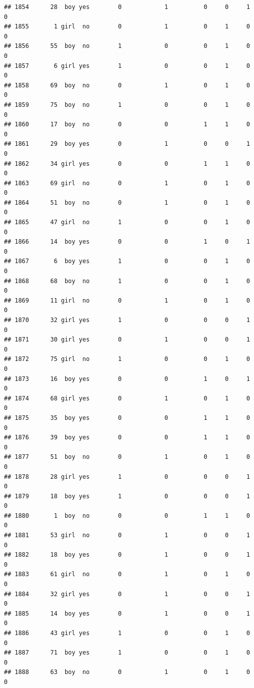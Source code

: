 \documentclass[man]{apa6}
\begin{document}
\begin{verbatim}
## 1854      28  boy yes        0            1          0     0     1     0
## 1855       1 girl  no        0            1          0     1     0     0
## 1856      55  boy  no        1            0          0     1     0     0
## 1857       6 girl yes        1            0          0     1     0     0
## 1858      69  boy  no        0            1          0     1     0     0
## 1859      75  boy  no        1            0          0     1     0     0
## 1860      17  boy  no        0            0          1     1     0     0
## 1861      29  boy yes        0            1          0     0     1     0
## 1862      34 girl yes        0            0          1     1     0     0
## 1863      69 girl  no        0            1          0     1     0     0
## 1864      51  boy  no        0            1          0     1     0     0
## 1865      47 girl  no        1            0          0     1     0     0
## 1866      14  boy yes        0            0          1     0     1     0
## 1867       6  boy yes        1            0          0     1     0     0
## 1868      68  boy  no        1            0          0     1     0     0
## 1869      11 girl  no        0            1          0     1     0     0
## 1870      32 girl yes        1            0          0     0     1     0
## 1871      30 girl yes        0            1          0     0     1     0
## 1872      75 girl  no        1            0          0     1     0     0
## 1873      16  boy yes        0            0          1     0     1     0
## 1874      68 girl yes        0            1          0     1     0     0
## 1875      35  boy yes        0            0          1     1     0     0
## 1876      39  boy yes        0            0          1     1     0     0
## 1877      51  boy  no        0            1          0     1     0     0
## 1878      28 girl yes        1            0          0     0     1     0
## 1879      18  boy yes        1            0          0     0     1     0
## 1880       1  boy  no        0            0          1     1     0     0
## 1881      53 girl  no        0            1          0     0     1     0
## 1882      18  boy yes        0            1          0     0     1     0
## 1883      61 girl  no        0            1          0     1     0     0
## 1884      32 girl yes        0            1          0     0     1     0
## 1885      14  boy yes        0            1          0     0     1     0
## 1886      43 girl yes        1            0          0     1     0     0
## 1887      71  boy yes        1            0          0     1     0     0
## 1888      63  boy  no        0            1          0     1     0     0

\end{verbatim}
\end{document}
